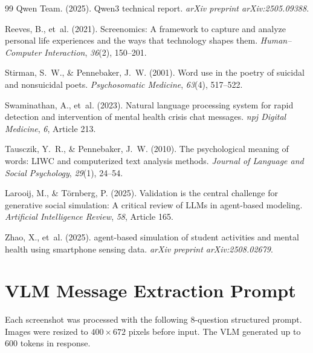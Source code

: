\documentclass[review,12pt,authoryear]{elsarticle}
\begin{document}
\begin{thebibliography}{99}
Qwen Team. (2025).
\newblock Qwen3 technical report.
\newblock \textit{arXiv preprint arXiv:2505.09388}.

Reeves, B., et~al. (2021).
\newblock Screenomics: {A} framework to capture and analyze personal life experiences and the ways that technology shapes them.
\newblock \textit{Human--Computer Interaction}, \textit{36}(2), 150--201.

Stirman, S.~W., \& Pennebaker, J.~W. (2001).
\newblock Word use in the poetry of suicidal and nonsuicidal poets.
\newblock \textit{Psychosomatic Medicine}, \textit{63}(4), 517--522.

Swaminathan, A., et~al. (2023).
\newblock Natural language processing system for rapid detection and intervention of mental health crisis chat messages.
\newblock \textit{npj Digital Medicine}, \textit{6}, Article 213.

Tausczik, Y.~R., \& Pennebaker, J.~W. (2010).
\newblock The psychological meaning of words: {LIWC} and computerized text analysis methods.
\newblock \textit{Journal of Language and Social Psychology}, \textit{29}(1), 24--54.

Larooij, M., \& T{\"o}rnberg, P. (2025).
\newblock Validation is the central challenge for generative social simulation: {A} critical review of {LLMs} in agent-based modeling.
\newblock \textit{Artificial Intelligence Review}, \textit{58}, Article 165.

Zhao, X., et~al. (2025).
 agent-based simulation of student activities and mental health using smartphone sensing data.
\newblock \textit{arXiv preprint arXiv:2508.02679}.

\end{thebibliography}


\appendix

\section{VLM Message Extraction Prompt}\label{app:vlm_prompts}

Each screenshot was processed with the following 8-question structured prompt. Images were resized to $400 \times 672$ pixels before input. The VLM generated up to 600 tokens in response.
\end{document}
